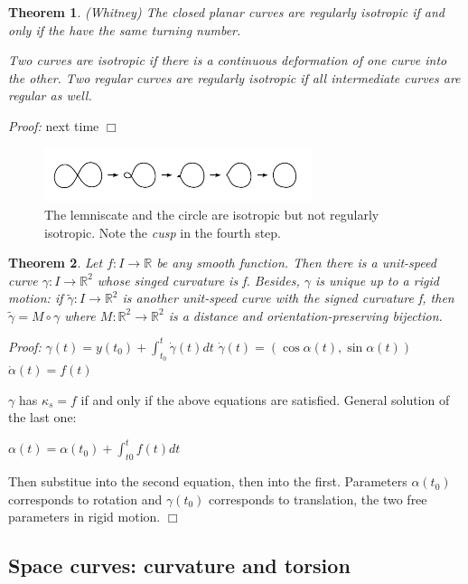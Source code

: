 \documentclass[a4paper,11pt,notitlepage,fullpage]{paper}
\newcommand{\y}{\gamma}
\newcommand{\dy}{\dot\gamma}
\theoremstyle{plain}
\newtheorem{thm}{Theorem}[section] %
\theoremstyle{definition}
\begin{document}
\begin{thm}
(Whitney) The closed planar curves are regularly isotropic if and only if the have the same turning number.

Two curves are \emph{isotropic} if there is a continuous deformation of one curve into the other. Two regular curves are \emph{regularly isotropic} if all intermediate curves are regular as well.
\end{thm}

\emph{Proof:} next time \hfill $\Box$

\begin{figure}[H]
\centering
\includegraphics[width = 0.7\textwidth]{img/lemniscate-to-circle}
\caption{The lemniscate and the circle are isotropic but not regularly isotropic. Note the  \emph{cusp} in the fourth step.}
\label{fig:lemniscate-to-circle}
\end{figure}


\begin{thm}
Let $f: I \to \mathbb R$ be any smooth function. Then there is a unit-speed curve $\gamma: I \to \mathbb R^2$ whose singed curvature is f. Besides, $\gamma$ is unique up to a rigid motion: if $\tilde\gamma : I \to \mathbb R^2$ is another unit-speed curve with the signed curvature f, then $\tilde\gamma = M \circ \gamma$ where $M: \mathbb R^2 \to \mathbb R^2$ is a distance and orientation-preserving bijection.
\end{thm}

\emph{Proof:} $\y(t) = y(t_0) + \int_{t_0}^t \dy(t) dt$
$\dy(t) = (\cos\alpha(t), \sin\alpha(t))$
$\dot\alpha(t) = f(t)$

$\y$ has $\kappa_s = f$ if and only if the above equations are satisfied. General solution of the last one:

$\alpha(t) = \alpha(t_0) + \int_{t0}^t f(t) dt$

Then substitue into the second equation, then into the first. Parameters $\alpha(t_0)$ corresponds to rotation and $\y(t_0)$ corresponds to translation, the two free parameters in rigid motion. \hfill $\Box$

\subsection{Space curves: curvature and torsion}
\end{document}
